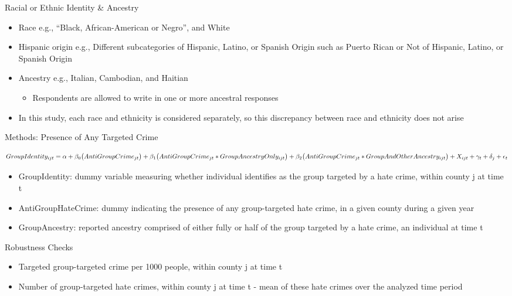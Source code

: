 \documentclass[ignorenonframetext,]{beamer}
\providecommand{\tightlist}{%
  \setlength{\itemsep}{0pt}\setlength{\parskip}{0pt}}
\begin{document}
\begin{frame}{Racial or Ethnic Identity \& Ancestry}

\begin{itemize}
\tightlist
\item
  Race e.g., ``Black, African-American or Negro'', and White
\item
  Hispanic origin e.g., Different subcategories of Hispanic, Latino, or
  Spanish Origin such as Puerto Rican or Not of Hispanic, Latino, or
  Spanish Origin
\item
  Ancestry e.g., Italian, Cambodian, and Haitian

  \begin{itemize}
      \item Respondents are allowed to write in one or more ancestral responses
  \end{itemize}
\item
  In this study, each race and ethnicity is considered separately, so
  this discrepancy between race and ethnicity does not arise
\end{itemize}

\end{frame}

\begin{frame}{Methods: Presence of Any Targeted Crime}

 \[GroupIdentity_{ijt} = \\ 
    \alpha + \beta_{0} \big(AntiGroupCrime_{jt} \big) + \\
    \beta_{1}  \big( AntiGroupCrime_{jt} * GroupAncestryOnly_{ijt} \big) + \\
    \beta_{2}  \big( AntiGroupCrime_{jt} * GroupAndOtherAncestry_{ijt} \big) + \\
    X_{ijt} + \gamma_{t}  + \delta_{j} + \epsilon_{t}\]

\begin{itemize}
    \item GroupIdentity: dummy variable measuring whether individual identifies as the group targeted by a hate crime, within county j at time t 
    \item AntiGroupHateCrime: dummy indicating the presence of any group-targeted hate crime, in a given county during a given year
    \item GroupAncestry: reported ancestry comprised of either fully or half of the group targeted by a hate crime, an individual at time t
\end{itemize}

\end{frame}

\begin{frame}{Robustness Checks}

\begin{itemize}
  \item Targeted group-targeted crime per 1000 people, within county j at time t
  \item Number of group-targeted hate crimes, within county j at time t - mean of these hate crimes over the analyzed time period
\end{itemize}

\end{frame}
\end{document}
